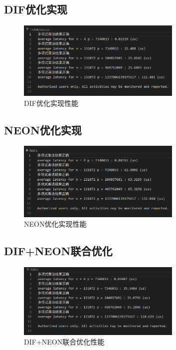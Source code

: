 \documentclass[a4paper,colorlinks=true,linkcolor=blue,urlcolor=blue,citecolor=green,bookmarks=true]{article}
\begin{document}
\subsection{DIF优化实现}
\begin{figure}[H]
  \centering
  \includegraphics[width=0.7\textwidth]{dif.png}
  \caption{DIF优化实现性能}
  \label{fig:dif_screenshot}
\end{figure}

\subsection{NEON优化实现}
\begin{figure}[H]
  \centering
  \includegraphics[width=0.7\textwidth]{neon.png}
  \caption{NEON优化实现性能}
  \label{fig:neon_screenshot}
\end{figure}

\subsection{DIF+NEON联合优化}
\begin{figure}[H]
  \centering
  \includegraphics[width=0.7\textwidth]{dif_neon_full.png}
  \caption{DIF+NEON联合优化性能}
  \label{fig:dif_neon_full_screenshot}
\end{figure}
\end{document}
